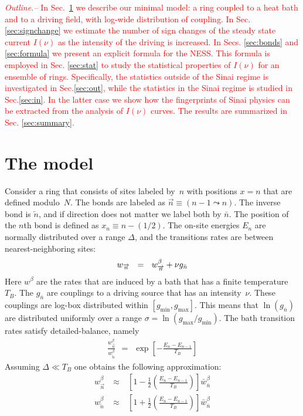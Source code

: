 \documentclass[aps,pre,floats,floatfix,twocolumn]{revtex4}
\newcommand{\mylabel}[1]{\label{#1}}
\newcommand{\beq}{\begin{eqnarray}}
\newcommand{\eeq}{\end{eqnarray}}
\newcommand{\be}[1]{\begin{eqnarray}\ifthenelse{#1=-1}
{\nonumber}{\ifthenelse{#1=0}{}{\mylabel{e#1}}}}
\newcommand{\rmrk}[1]{\textcolor{red}{#1}}
\begin{document}
\rmrk{{\em Outline.-- } 
%
In Sec.~\ref{sec:model} we describe our minimal model:
a ring coupled to a heat bath and to a driving field, 
with log-wide distribution of coupling.
%
In Sec. \ref{sec:signchange} we estimate the number of sign changes 
of the steady state current $I(\nu)$ as the intensity of the driving 
is increased.
%
In Secs. \ref{sec:bonds} and \ref{sec:formula} we present 
an explicit formula for the NESS. This formula is employed 
in Sec. \ref{sec:stat} to study the  statistical properties 
of $I(\nu)$ for an ensemble of rings. 
%
Specifically, the statistics outside of the Sinai regime 
is investigated in Sec.\ref{sec:out}, while the statistics 
in the Sinai regime is studied in Sec.\ref{sec:in}. 
In the latter case we show how the fingerprints of Sinai physics 
can be extracted from the analysis of $I(\nu)$ curves. 
%
The results are summarized in Sec. \ref{sec:summary}.}



\section{The model}
\label{sec:model}

Consider a ring that consists of sites labeled by~$n$ 
with positions ${x=n}$ that are defined modulo~$N$. 
The bonds are labeled as ${\overrightarrow{n}\equiv(n{-}1 \leadsto n)}$.
The inverse bond is $\overleftarrow{n}$, and if direction does 
not matter we label both by $\bar{n}$. The position of the $n$th bond 
is defined as $x_n \equiv n{-}(1/2)$. The on-site energies $E_n$ 
are normally distributed over a range $\Delta$,  
and the transitions rates are between nearest-neighboring sites:   
%
\be{1}
w_{\overrightarrow{n}} \ \ = \ \ w^{\beta}_{\overrightarrow{n}} + \nu g_{\bar{n}}
\eeq 
%
Here $w^{\beta}$ are the rates that are induced by a bath that has 
a finite temperature $T_B$. The $g_{\bar{n}}$ are 
couplings to a driving source that has an intensity~$\nu$. 
These couplings are log-box distributed within ${[g_{\text{min}},g_{\text{max}}]}$.
This means that $\ln(g_{\bar{n}})$ are distributed uniformly 
over a range ${\sigma=\ln(g_{\text{max}}/g_{\text{min}})}$. 
%
%
The bath transition rates satisfy detailed-balance, namely 
%
\beq
\frac{w^{\beta}_{\overrightarrow{n}}}{w^{\beta}_{\overleftarrow{n}}} 
\ \  = \ \ \exp\left[-\frac{E_{n}{-}E_{n{-}1}}{T_B}\right]
\eeq
%
Assuming ${\Delta \ll T_B}$ one obtains the following approximation: 
%
\beq
w^{\beta}_{\overrightarrow{n}} \ &\approx& \ \left[1-\frac{1}{2}\left(\frac{E_n-E_{n{-}1}}{T_B}\right)\right]\bar{w}_{\bar{n}}^{\beta} \\ 
w^{\beta}_{\overleftarrow{n}} \ &\approx& \ \left[1+\frac{1}{2}\left(\frac{E_n-E_{n{-}1}}{T_B}\right)\right]\bar{w}_{\bar{n}}^{\beta}
\eeq  
\end{document}
